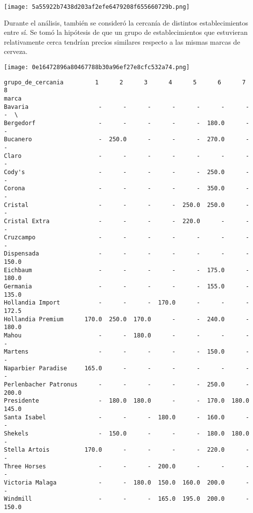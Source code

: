 \texttt{[image: 5a55922b7438d203af2efe6479208f655660729b.png]}

Durante el análisis, también se consideró la cercanía de distintos
establecimientos entre sí. Se tomó la hipótesis de que un grupo de
establecimientos que estuvieran relativamente cerca tendrían precios
similares respecto a las mismas marcas de cerveza.

\texttt{[image: 0e16472896a80467788b30a96ef27e8cfc532a74.png]}


\begin{verbatim}
grupo_de_cercania         1      2      3      4      5      6      7      8    
marca                                                                           
Bavaria                    -      -      -      -      -      -      -      -  \
Bergedorf                  -      -      -      -      -  180.0      -      -   
Bucanero                   -  250.0      -      -      -  270.0      -      -   
Claro                      -      -      -      -      -      -      -      -   
Cody's                     -      -      -      -      -  250.0      -      -   
Corona                     -      -      -      -      -  350.0      -      -   
Cristal                    -      -      -      -  250.0  250.0      -      -   
Cristal Extra              -      -      -      -  220.0      -      -      -   
Cruzcampo                  -      -      -      -      -      -      -      -   
Dispensada                 -      -      -      -      -      -      -  150.0   
Eichbaum                   -      -      -      -      -  175.0      -  180.0   
Germania                   -      -      -      -      -  155.0      -  135.0   
Hollandia Import           -      -      -  170.0      -      -      -  172.5   
Hollandia Premium      170.0  250.0  170.0      -      -  240.0      -  180.0   
Mahou                      -      -  180.0      -      -      -      -      -   
Martens                    -      -      -      -      -  150.0      -      -   
Naparbier Paradise     165.0      -      -      -      -      -      -      -   
Perlenbacher Patronus      -      -      -      -      -  250.0      -  200.0   
Presidente                 -  180.0  180.0      -      -  170.0  180.0  145.0   
Santa Isabel               -      -      -  180.0      -  160.0      -      -   
Shekels                    -  150.0      -      -      -  180.0  180.0      -   
Stella Artois          170.0      -      -      -      -  220.0      -      -   
Three Horses               -      -      -  200.0      -      -      -      -   
Victoria Malaga            -      -  180.0  150.0  160.0  200.0      -      -   
Windmill                   -      -      -  165.0  195.0  200.0      -  150.0   


\end{verbatim}
